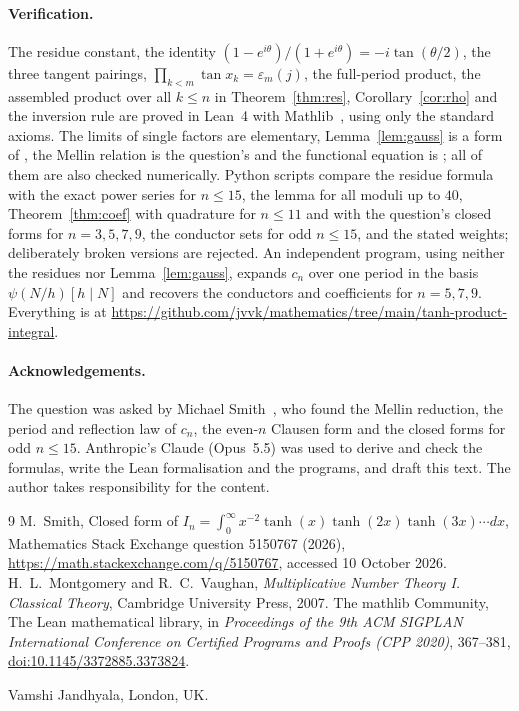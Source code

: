 \documentclass[11pt]{article}
\begin{document}
\paragraph{Verification.} The residue constant, the identity $(1-e^{i\theta})/(1+e^{i\theta})=-i\tan(\theta/2)$, the
three tangent pairings, $\prod_{k<m}\tan x_k=\varepsilon_m(j)$, the full-period product, the assembled product over
all $k\le n$ in Theorem~\ref{thm:res}, Corollary~\ref{cor:rho} and the inversion rule are proved in Lean~4 with
Mathlib~\cite{mathlib}, using only the standard axioms. The limits of single factors are elementary, Lemma~\ref{lem:gauss} is a form of
\cite[Theorem~9.12]{MV}, the Mellin relation is the question's and the functional equation is
\cite[Corollary~10.9]{MV}; all of them are also checked numerically. Python scripts compare the residue formula with the exact power series for $n\le15$, the lemma for all
moduli up to $40$, Theorem~\ref{thm:coef} with quadrature for $n\le11$ and with the question's closed forms for
$n=3,5,7,9$, the conductor sets for odd $n\le15$, and the stated weights; deliberately broken versions are rejected. An independent program, using neither the
residues nor Lemma~\ref{lem:gauss}, expands $c_n$ over one period in the basis $\psi(N/h)[h\mid N]$ and recovers the
conductors and coefficients for $n=5,7,9$.
Everything is at \url{https://github.com/jvvk/mathematics/tree/main/tanh-product-integral}.

\paragraph{Acknowledgements.} The question was asked by Michael Smith~\cite{MSE}, who found the Mellin reduction,
the period and reflection law of $c_n$, the even-$n$ Clausen form and the closed forms for odd $n\le15$. Anthropic's
Claude (Opus~5.5) was used to derive and check the formulas, write the Lean formalisation and the programs, and draft
this text. The author takes responsibility for the content.

\begin{thebibliography}{9}
 M.~Smith, Closed form of $I_n=\int_0^\infty x^{-2}\tanh(x)\tanh(2x)\tanh(3x)\cdots dx$, Mathematics
Stack Exchange question 5150767 (2026), \url{https://math.stackexchange.com/q/5150767}, accessed 10 October 2026.
 H.~L.~Montgomery and R.~C.~Vaughan, \emph{Multiplicative Number Theory I. Classical Theory},
Cambridge University Press, 2007.
 The mathlib Community, The Lean mathematical library, in \emph{Proceedings of the 9th ACM
SIGPLAN International Conference on Certified Programs and Proofs (CPP 2020)}, 367--381,
\href{https://doi.org/10.1145/3372885.3373824}{doi:10.1145/3372885.3373824}.
\end{thebibliography}

\bigskip
\noindent Vamshi Jandhyala, London, UK.
\end{document}
